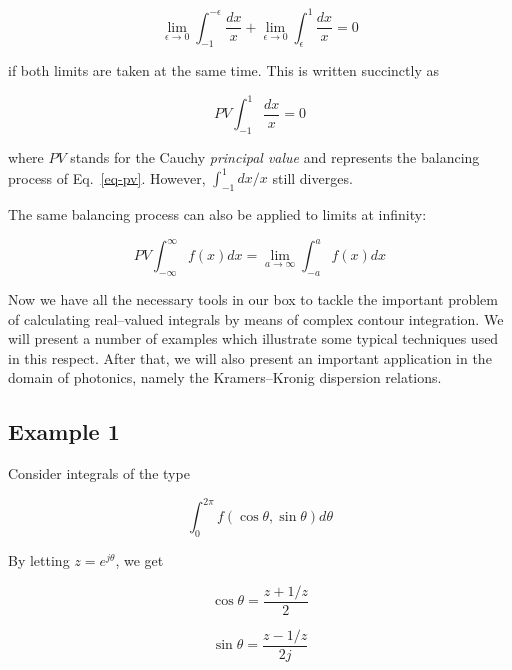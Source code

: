 \begin{equation}
\lim_{\epsilon \to 0} \int_{-1}^{-\epsilon} \frac{dx}{x} + \lim_{\epsilon \to 0}
\int_{\epsilon}^1 \frac{dx}{x} = 0 \label{eq-pv}
\end{equation}  

if both limits are taken at the same time. This is written succinctly as

\begin{equation}
PV \int_{-1}^1 \frac{dx}{x} = 0
\end{equation} 

where $PV$ stands for the Cauchy \emph{principal value} and represents the
balancing process of Eq.~\ref{eq-pv}. However, $\int_{-1}^1 dx / x$ still
diverges.

The same balancing process can also be applied to limits at infinity:

\begin{equation}
PV \int_{-\infty}^\infty f(x) dx = \lim_{a \to \infty} \int_{-a}^{a} f(x) dx
\end{equation} 



Now we have all the necessary tools in our box to tackle the important problem
of calculating real--valued integrals by means of complex contour integration.
We will present a number of examples which illustrate some typical techniques
used in this respect. After that, we will also present an important application
in the domain of photonics, namely the Kramers--Kronig dispersion relations.

\subsection*{Example 1}

Consider integrals of the type

\begin{equation}
\int_0^{2 \pi} f(\cos \theta, \sin \theta) d \theta \label{eq-cont-int-1}
\end{equation} 

By letting $z=e^{j \theta}$, we get 

\begin{equation}
\cos \theta = \frac{z + 1/z}{2}
\end{equation} 

\begin{equation}
\sin \theta = \frac{z - 1/z}{2j}
\end{equation} 

